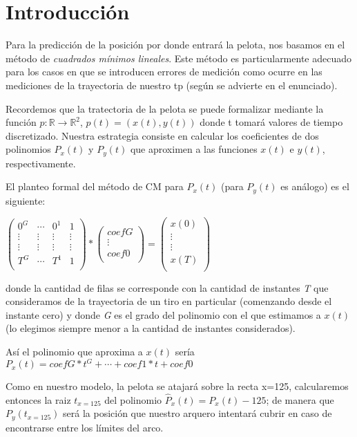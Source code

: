 
\section{Introducción}

Para la predicción de la posición por donde entrará la pelota, nos basamos en el método de \emph{cuadrados mínimos lineales}. Este método es particularmente adecuado para los casos en que se introducen errores de medición\cite[\emph{3.2}]{heath} como ocurre en las mediciones de la trayectoria de nuestro tp (según se advierte en el enunciado).
\par
Recordemos que la tratectoria de la pelota se puede formalizar mediante la función $p:\mathbb{R} \to \mathbb{R}^2$, $p(t) = (x(t),y(t))$ donde t tomará valores de tiempo discretizado. Nuestra estrategia consiste en calcular los coeficientes de dos polinomios $P_x(t)$ y $P_y(t)$ que aproximen a las funciones $x(t)$ e $y(t)$, respectivamente. 

\par
El planteo formal del método de CM para $P_x(t)$ (para $P_y(t)$ es análogo) es el siguiente:
\par
$
\begin{pmatrix}
  0^G & \cdots    & 0^1 & 1	\\
  \vdots &  \vdots &  \vdots & \vdots  \\ 
  \vdots &  \vdots &  \vdots & \vdots  \\ 
  T^G & \cdots & T^1 & 1\\
\end{pmatrix}
*
\begin{pmatrix}
 coefG\\
 \vdots\\
 coef0\\
\end{pmatrix}
 =
\begin{pmatrix}
  x(0)\\
  \vdots \\
  \vdots \\
  x(T)\\ 

\end{pmatrix}
$
\par
donde la cantidad de filas se corresponde con la cantidad de instantes \emph{T} que consideramos de la trayectoria de un tiro en particular (comenzando desde el instante cero) y donde \emph{G} es el grado del polinomio con el que estimamos a $x(t)$ (lo elegimos siempre menor a la cantidad de instantes considerados).
\par
Así el polinomio que aproxima a $x(t)$ sería $P_x(t)=coefG*t^G + \cdots + coef1*t + coef0$
\par
Como en nuestro modelo, la pelota se atajará sobre la recta x=125, calcularemos entonces la raiz $t_{x=125}$ del polinomio $\hat{P}_x(t) = P_x(t) -125$; de manera que $P_y(t_{x=125})$ será la posición que nuestro arquero intentará cubrir en caso de encontrarse entre los límites del arco.
